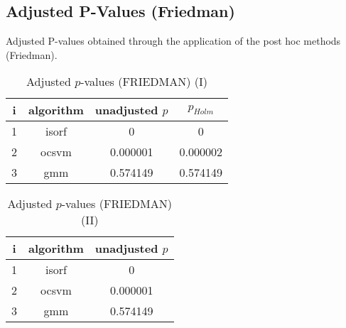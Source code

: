 \documentclass[a4paper,10pt]{article}
\begin{document}
\begin{landscape}
\newpage

\section{Adjusted P-Values (Friedman)}


Adjusted P-values obtained through the application of the post hoc methods (Friedman).

\begin{table}[!htp]
\centering\small
\begin{tabular}{cccc}
i&algorithm&unadjusted $p$&$p_{Holm}$\\
\hline1&isorf&0&0\\2&ocsvm&0.000001&0.000002\\3&gmm&0.574149&0.574149\\\hline
\end{tabular}
\caption{Adjusted $p$-values (FRIEDMAN) (I)}
\end{table}
\begin{table}[!htp]
\centering\small
\begin{tabular}{ccc}
i&algorithm&unadjusted $p$\\
\hline1&isorf&0\\2&ocsvm&0.000001\\3&gmm&0.574149\\\hline
\end{tabular}
\caption{Adjusted $p$-values (FRIEDMAN) (II)}
\end{table}

\newpage
\end{landscape}
\end{document}

